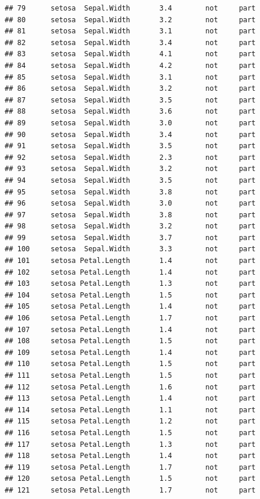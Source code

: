 \documentclass[krantz2]{krantz}\usepackage{knitr}%
\begin{document}
\begin{knitrout}
\begin{kframe}
\begin{verbatim}
## 79      setosa  Sepal.Width       3.4        not     part
## 80      setosa  Sepal.Width       3.2        not     part
## 81      setosa  Sepal.Width       3.1        not     part
## 82      setosa  Sepal.Width       3.4        not     part
## 83      setosa  Sepal.Width       4.1        not     part
## 84      setosa  Sepal.Width       4.2        not     part
## 85      setosa  Sepal.Width       3.1        not     part
## 86      setosa  Sepal.Width       3.2        not     part
## 87      setosa  Sepal.Width       3.5        not     part
## 88      setosa  Sepal.Width       3.6        not     part
## 89      setosa  Sepal.Width       3.0        not     part
## 90      setosa  Sepal.Width       3.4        not     part
## 91      setosa  Sepal.Width       3.5        not     part
## 92      setosa  Sepal.Width       2.3        not     part
## 93      setosa  Sepal.Width       3.2        not     part
## 94      setosa  Sepal.Width       3.5        not     part
## 95      setosa  Sepal.Width       3.8        not     part
## 96      setosa  Sepal.Width       3.0        not     part
## 97      setosa  Sepal.Width       3.8        not     part
## 98      setosa  Sepal.Width       3.2        not     part
## 99      setosa  Sepal.Width       3.7        not     part
## 100     setosa  Sepal.Width       3.3        not     part
## 101     setosa Petal.Length       1.4        not     part
## 102     setosa Petal.Length       1.4        not     part
## 103     setosa Petal.Length       1.3        not     part
## 104     setosa Petal.Length       1.5        not     part
## 105     setosa Petal.Length       1.4        not     part
## 106     setosa Petal.Length       1.7        not     part
## 107     setosa Petal.Length       1.4        not     part
## 108     setosa Petal.Length       1.5        not     part
## 109     setosa Petal.Length       1.4        not     part
## 110     setosa Petal.Length       1.5        not     part
## 111     setosa Petal.Length       1.5        not     part
## 112     setosa Petal.Length       1.6        not     part
## 113     setosa Petal.Length       1.4        not     part
## 114     setosa Petal.Length       1.1        not     part
## 115     setosa Petal.Length       1.2        not     part
## 116     setosa Petal.Length       1.5        not     part
## 117     setosa Petal.Length       1.3        not     part
## 118     setosa Petal.Length       1.4        not     part
## 119     setosa Petal.Length       1.7        not     part
## 120     setosa Petal.Length       1.5        not     part
## 121     setosa Petal.Length       1.7        not     part

\end{verbatim}
\end{kframe}
\end{knitrout}
\end{document}
